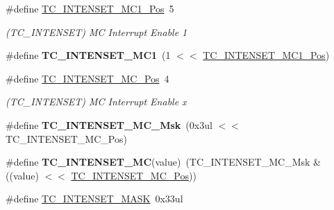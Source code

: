 \begin{DoxyCompactItemize}
\item 
\hypertarget{group___s_a_m_l21___t_c_ga51ae14dbca405d41cd83d9588d662bf1}{}\#define \hyperlink{group___s_a_m_l21___t_c_ga51ae14dbca405d41cd83d9588d662bf1}{T\+C\+\_\+\+I\+N\+T\+E\+N\+S\+E\+T\+\_\+\+M\+C1\+\_\+\+Pos}~5\label{group___s_a_m_l21___t_c_ga51ae14dbca405d41cd83d9588d662bf1}

\begin{DoxyCompactList}\small\item\em (T\+C\+\_\+\+I\+N\+T\+E\+N\+S\+E\+T) M\+C Interrupt Enable 1 \end{DoxyCompactList}\item 
\hypertarget{group___s_a_m_l21___t_c_gad8e1e2b456e4f231da82f48054c8ff60}{}\#define {\bfseries T\+C\+\_\+\+I\+N\+T\+E\+N\+S\+E\+T\+\_\+\+M\+C1}~(1 $<$$<$ \hyperlink{group___s_a_m_l21___t_c_ga51ae14dbca405d41cd83d9588d662bf1}{T\+C\+\_\+\+I\+N\+T\+E\+N\+S\+E\+T\+\_\+\+M\+C1\+\_\+\+Pos})\label{group___s_a_m_l21___t_c_gad8e1e2b456e4f231da82f48054c8ff60}

\item 
\hypertarget{group___s_a_m_l21___t_c_ga0affd52c9cb86de0f284a9076745e992}{}\#define \hyperlink{group___s_a_m_l21___t_c_ga0affd52c9cb86de0f284a9076745e992}{T\+C\+\_\+\+I\+N\+T\+E\+N\+S\+E\+T\+\_\+\+M\+C\+\_\+\+Pos}~4\label{group___s_a_m_l21___t_c_ga0affd52c9cb86de0f284a9076745e992}

\begin{DoxyCompactList}\small\item\em (T\+C\+\_\+\+I\+N\+T\+E\+N\+S\+E\+T) M\+C Interrupt Enable x \end{DoxyCompactList}\item 
\hypertarget{group___s_a_m_l21___t_c_gac13470f7837cc5b1047c413a6523ca1a}{}\#define {\bfseries T\+C\+\_\+\+I\+N\+T\+E\+N\+S\+E\+T\+\_\+\+M\+C\+\_\+\+Msk}~(0x3ul $<$$<$ T\+C\+\_\+\+I\+N\+T\+E\+N\+S\+E\+T\+\_\+\+M\+C\+\_\+\+Pos)\label{group___s_a_m_l21___t_c_gac13470f7837cc5b1047c413a6523ca1a}

\item 
\hypertarget{group___s_a_m_l21___t_c_ga9e41897cae9a723e0c221dcf54f4d59d}{}\#define {\bfseries T\+C\+\_\+\+I\+N\+T\+E\+N\+S\+E\+T\+\_\+\+M\+C}(value)~(T\+C\+\_\+\+I\+N\+T\+E\+N\+S\+E\+T\+\_\+\+M\+C\+\_\+\+Msk \& ((value) $<$$<$ \hyperlink{group___s_a_m_l21___t_c_ga0affd52c9cb86de0f284a9076745e992}{T\+C\+\_\+\+I\+N\+T\+E\+N\+S\+E\+T\+\_\+\+M\+C\+\_\+\+Pos}))\label{group___s_a_m_l21___t_c_ga9e41897cae9a723e0c221dcf54f4d59d}

\item 
\hypertarget{group___s_a_m_l21___t_c_ga3aa1746709bd45b7aac8041652c767f0}{}\#define \hyperlink{group___s_a_m_l21___t_c_ga3aa1746709bd45b7aac8041652c767f0}{T\+C\+\_\+\+I\+N\+T\+E\+N\+S\+E\+T\+\_\+\+M\+A\+S\+K}~0x33ul\label{group___s_a_m_l21___t_c_ga3aa1746709bd45b7aac8041652c767f0}


\end{DoxyCompactItemize}

